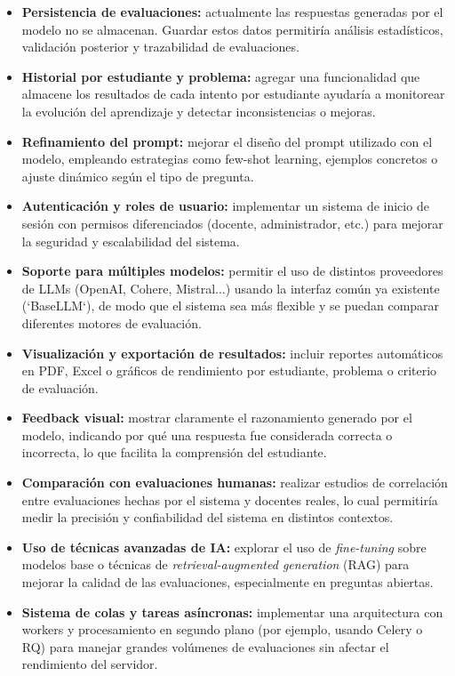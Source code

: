 \documentclass[12pt]{article}
\begin{document}
\begin{itemize}
  \item \textbf{Persistencia de evaluaciones:} actualmente las respuestas generadas por el modelo no se almacenan. Guardar estos datos permitiría análisis estadísticos, validación posterior y trazabilidad de evaluaciones.
  
  \item \textbf{Historial por estudiante y problema:} agregar una funcionalidad que almacene los resultados de cada intento por estudiante ayudaría a monitorear la evolución del aprendizaje y detectar inconsistencias o mejoras.

  \item \textbf{Refinamiento del prompt:} mejorar el diseño del prompt utilizado con el modelo, empleando estrategias como few-shot learning, ejemplos concretos o ajuste dinámico según el tipo de pregunta.

  \item \textbf{Autenticación y roles de usuario:} implementar un sistema de inicio de sesión con permisos diferenciados (docente, administrador, etc.) para mejorar la seguridad y escalabilidad del sistema.

  \item \textbf{Soporte para múltiples modelos:} permitir el uso de distintos proveedores de LLMs (OpenAI, Cohere, Mistral...) usando la interfaz común ya existente (`BaseLLM`), de modo que el sistema sea más flexible y se puedan comparar diferentes motores de evaluación.

  \item \textbf{Visualización y exportación de resultados:} incluir reportes automáticos en PDF, Excel o gráficos de rendimiento por estudiante, problema o criterio de evaluación.

  \item \textbf{Feedback visual:} mostrar claramente el razonamiento generado por el modelo, indicando por qué una respuesta fue considerada correcta o incorrecta, lo que facilita la comprensión del estudiante.

  \item \textbf{Comparación con evaluaciones humanas:} realizar estudios de correlación entre evaluaciones hechas por el sistema y docentes reales, lo cual permitiría medir la precisión y confiabilidad del sistema en distintos contextos.

  \item \textbf{Uso de técnicas avanzadas de IA:} explorar el uso de \textit{fine-tuning} sobre modelos base o técnicas de \textit{retrieval-augmented generation} (RAG) para mejorar la calidad de las evaluaciones, especialmente en preguntas abiertas.

  \item \textbf{Sistema de colas y tareas asíncronas:} implementar una arquitectura con workers y procesamiento en segundo plano (por ejemplo, usando Celery o RQ) para manejar grandes volúmenes de evaluaciones sin afectar el rendimiento del servidor.
\end{itemize}
\end{document}
